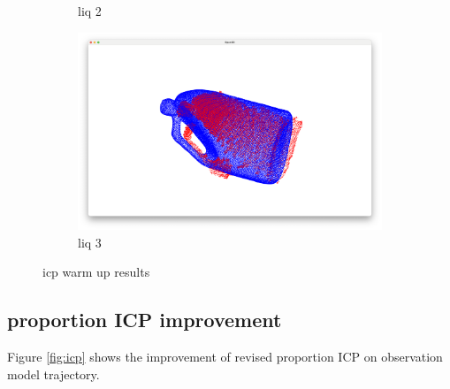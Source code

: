 \documentclass[conference]{IEEEtran}
\begin{document}
\begin{figure}
\begin{subfigure}{0.24\textwidth}
        \caption{liq 2}
        \label{fig:liq_2}
    \end{subfigure}
    \hfill
    \begin{subfigure}{0.24\textwidth}
        \includegraphics[width=\linewidth]{../code/icp_warm_up/liq_3.png}
        \caption{liq 3}
        \label{fig:liq_3}
    \end{subfigure}
    
    \caption{icp warm up results}
    \label{fig:icp_warm_up}
\end{figure}

\subsection{proportion ICP improvement}
Figure \ref*{fig:icp} shows the improvement of revised proportion ICP 
on observation model trajectory.
\end{document}
